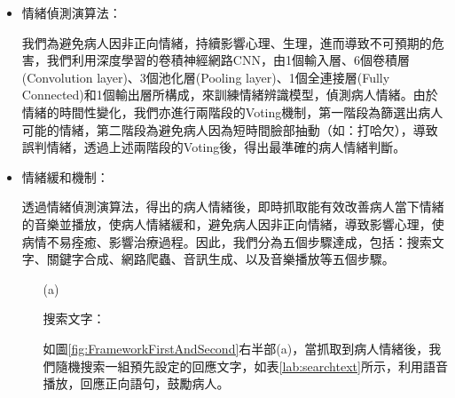 \documentclass[12pt]{scrreprt}
\begin{document}
\begin{itemize}
\item{\begin{bfseries}{情緒偵測演算法：}\end{bfseries}}我們為避免病人因非正向情緒，持續影響心理、生理，進而導致不可預期的危害，我們利用深度學習的卷積神經網路CNN，由1個輸入層、6個卷積層(Convolution layer)、3個池化層(Pooling layer)、1個全連接層(Fully Connected)和1個輸出層所構成，來訓練情緒辨識模型，偵測病人情緒。由於情緒的時間性變化，我們亦進行兩階段的Voting機制，第一階段為篩選出病人可能的情緒，第二階段為避免病人因為短時間臉部抽動（如：打哈欠），導致誤判情緒，透過上述兩階段的Voting後，得出最準確的病人情緒判斷。\\

\item{\begin{bfseries}{情緒緩和機制：}\end{bfseries}}透過情緒偵測演算法，得出的病人情緒後，即時抓取能有效改善病人當下情緒的音樂並播放，使病人情緒緩和，避免病人因非正向情緒，導致影響心理，使病情不易痊癒、影響治療過程。因此，我們分為五個步驟達成，包括：搜索文字、關鍵字合成、網路爬蟲、音訊生成、以及音樂播放等五個步驟。
\begin{itemize}
\item[(a)]{\begin{bfseries}{搜索文字：}\end{bfseries}}

如圖\ref{fig:FrameworkFirstAndSecond}右半部(a)，當抓取到病人情緒後，我們隨機搜索一組預先設定的回應文字，如表\ref{lab:searchtext}所示，利用語音播放，回應正向語句，鼓勵病人。

\renewcommand{\arraystretch}{1.0} 
\renewcommand{\multirowsetup}{\centering}


\end{itemize}
\end{itemize}
\end{document}
